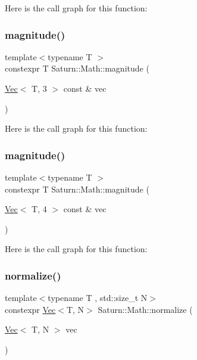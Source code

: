 Here is the call graph for this function\+:
\mbox{\label{namespace_saturn_1_1_math_a698ac890b34dc3f4b0daf0c822ec5aa5}} 
\subsubsection{\texorpdfstring{magnitude()}{magnitude()}\hspace{0.1cm}{\footnotesize\ttfamily [3/4]}}
{\footnotesize\ttfamily template$<$typename T $>$ \\
constexpr T Saturn\+::\+Math\+::magnitude (\begin{DoxyParamCaption}\item[{\mbox{\hyperlink{class_saturn_1_1_math_1_1_vec}{Vec}}$<$ T, 3 $>$ const \&}]{vec }\end{DoxyParamCaption})}

Here is the call graph for this function\+:
\mbox{\label{namespace_saturn_1_1_math_a8d1fd41759eefea6aa21a3879ffb2227}} 
\subsubsection{\texorpdfstring{magnitude()}{magnitude()}\hspace{0.1cm}{\footnotesize\ttfamily [4/4]}}
{\footnotesize\ttfamily template$<$typename T $>$ \\
constexpr T Saturn\+::\+Math\+::magnitude (\begin{DoxyParamCaption}\item[{\mbox{\hyperlink{class_saturn_1_1_math_1_1_vec}{Vec}}$<$ T, 4 $>$ const \&}]{vec }\end{DoxyParamCaption})}

Here is the call graph for this function\+:
\mbox{\label{namespace_saturn_1_1_math_aad3d1a0d501e45450f653fe277b675ae}} 
\subsubsection{\texorpdfstring{normalize()}{normalize()}}
{\footnotesize\ttfamily template$<$typename T , std\+::size\+\_\+t N$>$ \\
constexpr \mbox{\hyperlink{class_saturn_1_1_math_1_1_vec}{Vec}}$<$T, N$>$ Saturn\+::\+Math\+::normalize (\begin{DoxyParamCaption}\item[{\mbox{\hyperlink{class_saturn_1_1_math_1_1_vec}{Vec}}$<$ T, N $>$}]{vec }\end{DoxyParamCaption})}

